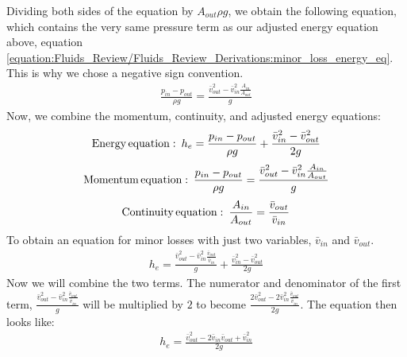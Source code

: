 \documentclass[letterpaper,10pt,english]{sphinxmanual}
\begin{document}
Dividing both sides of the equation by \(A_{out} \rho g\), we obtain the following equation, which contains the very same pressure term as our adjusted energy equation above, equation \eqref{equation:Fluids_Review/Fluids_Review_Derivations:minor_loss_energy_eq}. This is why we chose a negative sign convention.
\begin{equation}\label{equation:Fluids_Review/Fluids_Review_Derivations:Fluids_Review/Fluids_Review_Derivations:6}
\begin{split}\frac{p_{in} - p_{out}}{\rho g} = \frac{\bar v_{out}^2 - \bar v_{in}^2 \frac{A_{in}}{A_{out}}}{g}\end{split}
\end{equation}
Now, we combine the momentum, continuity, and adjusted energy equations:
\begin{equation}\label{equation:Fluids_Review/Fluids_Review_Derivations:Fluids_Review/Fluids_Review_Derivations:7}
\begin{split}{\rm{Energy \, equation:}} \,\,\,  h_e = \frac{p_{in} - p_{out}}{\rho g} + \frac{\bar v_{in}^2 - \bar v_{out}^2}{2g}\end{split}
\end{equation}\begin{equation}\label{equation:Fluids_Review/Fluids_Review_Derivations:Fluids_Review/Fluids_Review_Derivations:8}
\begin{split}{\rm{Momentum \, equation:}} \,\,\, \frac{p_{in} - p_{out}}{\rho g} = \frac{\bar v_{out}^2 - \bar v_{in}^2 \frac{A_{in}}{A_{out}}}{g}\end{split}
\end{equation}\begin{equation}\label{equation:Fluids_Review/Fluids_Review_Derivations:Fluids_Review/Fluids_Review_Derivations:9}
\begin{split}{\rm{Continuity \, equation:}} \,\,\, \frac{A_{in}}{A_{out}} = \frac{\bar v_{out}}{\bar v_{in}}\end{split}
\end{equation}
To obtain an equation for minor losses with just two variables, \(\bar v_{in}\) and \(\bar v_{out}\).
\begin{equation}\label{equation:Fluids_Review/Fluids_Review_Derivations:Fluids_Review/Fluids_Review_Derivations:10}
\begin{split}h_e = \frac{\bar v_{out}^2 - \bar v_{in}^2\frac{\bar v_{out}}{\bar v_{in}}}{g} + \frac{\bar v_{in}^2 - \bar v_{out}^2}{2g}\end{split}
\end{equation}
Now we will combine the two terms. The numerator and denominator of the first term, \(\frac{\bar v_{out}^2 - \bar v_{in}^2\frac{\bar v_{out}}{\bar v_{in}}}{g}\) will be multiplied by \(2\) to become \(\frac{2 \bar v_{out}^2 - 2 \bar v_{in}^2\frac{\bar v_{out}}{\bar v_{in}}}{2 g}\). The equation then looks like:
\begin{equation}\label{equation:Fluids_Review/Fluids_Review_Derivations:Fluids_Review/Fluids_Review_Derivations:11}
\begin{split}h_e = \frac{\bar v_{out}^2 - 2 \bar v_{in} \bar v_{out} + \bar v_{in}^2}{2g}\end{split}
\end{equation}
\end{document}
